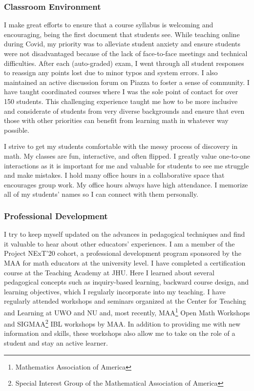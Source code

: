 \documentclass[
]{report}
\begin{document}
\hypertarget{classroom-environment}{%
\subsubsection*{Classroom Environment}\label{classroom-environment}}


I make great efforts to ensure that a course syllabus is welcoming and encouraging, being the first document that students see. While teaching online during Covid, my priority was to alleviate student anxiety and ensure students were not disadvantaged because of the lack of face-to-face meetings and technical difficulties. After each (auto-graded) exam, I went through all student responses to reassign any points lost due to minor typos and system errors. I also maintained an active discussion forum on Piazza to foster a sense of community. I have taught coordinated courses where I was the sole point of contact for over 150 students. This challenging experience taught me how to be more inclusive and considerate of students from very diverse backgrounds and ensure that even those with other priorities can benefit from learning math in whatever way possible.

I strive to get my students comfortable with the messy process of discovery in math. My classes are fun, interactive, and often flipped. I greatly value one-to-one interactions as it is important for me and valuable for students to see me struggle and make mistakes. I hold many office hours in a collaborative space that encourages group work. My office hours always have high attendance. I memorize all of my students' names so I can connect with them personally.

\hypertarget{professional-development}{%
\subsubsection*{Professional Development}\label{professional-development}}


I try to keep myself updated on the advances in pedagogical techniques and find it valuable to hear about other educators' experiences. I am a member of the Project NExT'20 cohort, a professional development program sponsored by the MAA for math educators at the university level. I have completed a certification course at the Teaching Academy at JHU. Here I learned about several pedagogical concepts such as inquiry-based learning, backward course design, and learning objectives, which I regularly incorporate into my teaching. I have regularly attended workshops and seminars organized at the Center for Teaching and Learning at UWO and NU and, most recently, MAA\footnote{Mathematics Association of America} Open Math Workshops and SIGMAA\footnote{Special Interest Group of the Mathematical Association of America} IBL workshops by MAA.
In addition to providing me with new information and skills, these workshops also allow me to take on the role of a student and stay an active learner.
\end{document}
